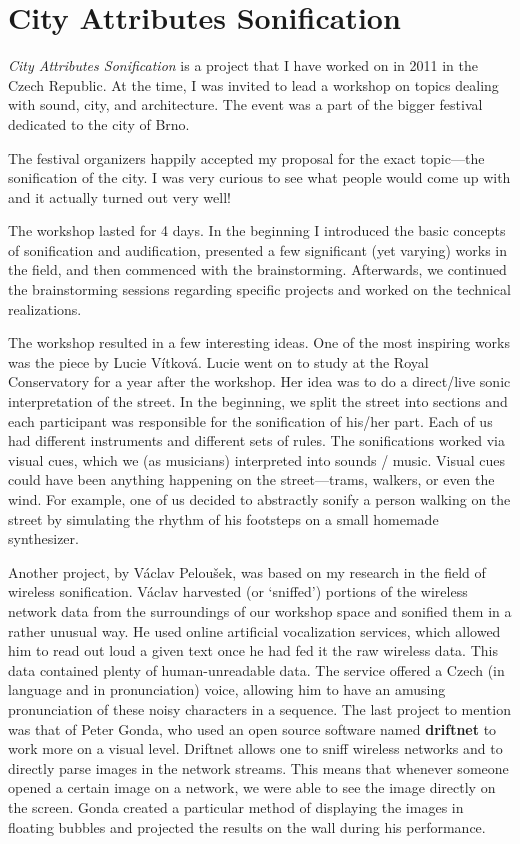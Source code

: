 \documentclass[12pt,a4paper,oneside]{report}
\begin{document}

\clearpage
\section{City Attributes Sonification}

\emph{City Attributes Sonification} is a project that I have worked on in 2011 in the Czech Republic. At the time, I was invited to lead a workshop on topics dealing with sound, city, and architecture. The event was a part of the bigger festival dedicated to the city of Brno.

The festival organizers happily accepted my proposal for the exact topic---the sonification of the city. I was very curious to see what people would come up with and it actually turned out very well!

The workshop lasted for 4 days. In the beginning I introduced the basic concepts of sonification and audification, presented a few significant (yet varying) works in the field, and then commenced with the brainstorming. Afterwards, we continued the brainstorming sessions regarding specific projects and worked on the technical realizations.

The workshop resulted in a few interesting ideas. One of the most inspiring works was the piece by Lucie Vítková. Lucie went on to study at the Royal Conservatory for a year after the workshop. Her idea was to do a direct/live sonic interpretation of the street. In the beginning, we split the street into sections and each participant was responsible for the sonification of his/her part. Each of us had different instruments and different sets of rules. The sonifications worked via visual cues, which we (as musicians) interpreted into sounds / music. Visual cues could have been anything happening on the street---trams, walkers, or even the wind. For example, one of us decided to abstractly sonify a person walking on the street by simulating the rhythm of his footsteps on a small homemade synthesizer.

Another project, by Václav Peloušek, was based on my research in the field of wireless sonification. Václav harvested (or `sniffed') portions of the wireless network data from the surroundings of our workshop space and sonified them in a rather unusual way. He used online artificial vocalization services, which allowed him to read out loud a given text once he had fed it the raw wireless data. This data contained plenty of human-unreadable data. The service offered a Czech (in language and in pronunciation) voice, allowing him to have an amusing pronunciation of these noisy characters in a sequence. The last project to mention was that of Peter Gonda, who used an open source software named \textbf{driftnet} to work more on a visual level. Driftnet allows one to sniff wireless networks and to directly parse images in the network streams. This means that whenever someone opened a certain image on a network, we were able to see the image directly on the screen. Gonda created a particular method of displaying the images in floating bubbles and projected the results on the wall during his performance.
\end{document}

